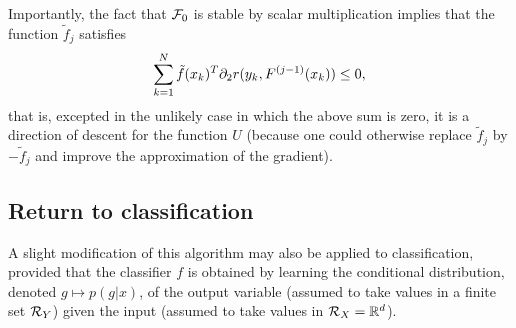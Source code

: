 \begin{remark}
Importantly, the fact that ${\mathcal F}_0$ is stable by scalar multiplication implies that the function $\tilde f_j$ satisfies 
\[
\sum_{k=1}^N \tilde f(x_k)^T \partial_2 r(y_k, F^{(j-1)}(x_k)) \leq 0, 
\] 
that is, excepted in the unlikely case in which the above sum is zero, it is a direction of descent for the function $U$ (because one could otherwise replace $\tilde f_j$ by $-\tilde f_j$ and improve the approximation of the gradient).
%
%
%
%

\end{remark}

\subsection{Return to classification}
A slight modification of this algorithm may also be applied to classification, provided that the classifier $f$ is obtained by learning the conditional distribution, denoted $g \mapsto p(g|x)$, of the output variable (assumed to take values in a finite set ${\mathcal R}_Y$) given the input (assumed to take values in ${\mathcal R}_X = {\mathbb{R}}^d$). 


